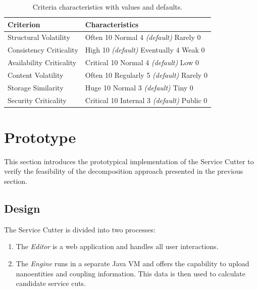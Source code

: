\begin{table}[H]
	\centering
	\caption{Criteria characteristics with values and defaults.}
	\label{tab:characteristics}
	\begin{tabular}{|p{150pt}|p{150pt}|}
		\hline	
		\textbf{Criterion} & \textbf{Characteristics} \\
		\hline
		Structural Volatility & Often 10 \newline Normal 4 \textit{(default)} \newline Rarely 0 \\
		\hline
		Consistency Criticality & High 10 \textit{(default)} \newline Eventually 4 \newline Weak 0 \\
		\hline
		Availability Criticality & Critical 10 \newline Normal 4 \textit{(default)} \newline Low 0 \\
		\hline
		Content Volatility & Often 10 \newline Regularly 5 \textit{(default)} \newline Rarely 0 \\
		\hline
		Storage Similarity & Huge 10 \newline Normal 3 \textit{(default)} \newline Tiny 0 \\
		\hline
		Security Criticality & Critical 10 \newline Internal 3 \textit{(default)} \newline Public 0 \\
		\hline
	\end{tabular}
\end{table}

\section{Prototype} 

This section introduces the prototypical implementation of the Service Cutter to verify the feasibility of the decomposition approach presented in the previous section.

\subsection{Design}

The Service Cutter is divided into two processes:

\begin{enumerate}
	\item The \textit{Editor} is a web application and handles all user interactions.
	\item The \textit{Engine} runs in a separate Java \gls{VM} and offers the capability to upload nanoentities and coupling information. This data is then used to calculate candidate service cuts.
\end{enumerate}

